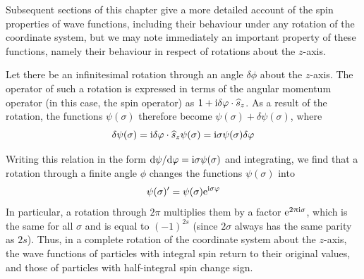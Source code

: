 Subsequent sections of this chapter give a more detailed account of the spin properties of wave functions, including their behaviour under any rotation of the coordinate system, but we may note immediately an important property of these functions, namely their behaviour in respect of rotations about the $ z $-axis.

Let there be an infinitesimal rotation through an angle $ \delta\phi $ about the $ z $-axis. The operator of such a rotation is expressed in terms of the angular momentum operator (in this case, the spin operator) as $ 1 + \mathrm{i} \delta\varphi\cdot\widehat{s}_z $. As a result of the rotation, the functions $ \psi(\sigma) $ therefore become $ \psi(\sigma) + \delta\psi(\sigma) $, where
\[ \delta\psi(\sigma)=\mathrm{i}\delta\varphi\cdot\widehat{s}_z\psi(\sigma)=\mathrm{i}\sigma\psi(\sigma)\delta\varphi \]



Writing this relation in the form $ \mathrm{d}\psi/\mathrm{d}\varphi = \mathrm{i}\sigma\psi(\sigma) $ and integrating, we find that a rotation through a finite angle $\phi$ changes the functions $\psi(\sigma)$ into
\begin{equation}\label{55.12}
\psi(\sigma)'=\psi(\sigma)\mathrm{e}^{\mathrm{i}\sigma\varphi}
\end{equation}
In particular, a rotation through $ 2\pi $ multiplies them by a factor $ \mathrm{e}^{2\uppi\mathrm{i}\sigma} $, which is the same for all $\sigma$ and is equal to $ (-1)^{2s} $ (since $ 2\sigma $ always has the same parity as $ 2s $). Thus, in a complete rotation of the coordinate system about the $ z $-axis, the wave functions of particles with integral spin return to their original values, and those of particles with half-integral spin change sign.





